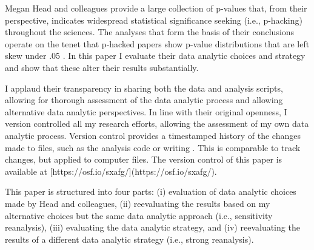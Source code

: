 Megan Head and colleagues provide a large collection of p-values that, from their perspective, indicates widespread statistical significance seeking (i.e., p-hacking) throughout the sciences. The analyses that form the basis of their conclusions operate on the tenet that p-hacked papers show p-value distributions that are left skew under .05 \cite{Simonsohn2014}. In this paper I evaluate their data analytic choices and strategy and show that these alter their results substantially. 

I applaud their transparency in sharing both the data and analysis scripts, allowing for thorough assessment of the data analytic process and allowing alternative data analytic perspectives. In line with their original openness, I version controlled all my research efforts, allowing the assessment of my own data analytic process. Version control provides a timestamped history of the changes made to files, such as the analysis code or writing \cite{Ram2013}. This is comparable to track changes, but applied to computer files. The version control of this paper is available at [https://osf.io/sxafg/](https://osf.io/sxafg/).

This paper is structured into four parts: (i) evaluation of data analytic choices made by Head and colleagues, (ii) reevaluating the results based on my alternative choices but the same data analytic approach (i.e., sensitivity reanalysis), (iii) evaluating the data analytic strategy, and (iv) reevaluating the results of a different data analytic strategy (i.e., strong reanalysis). 